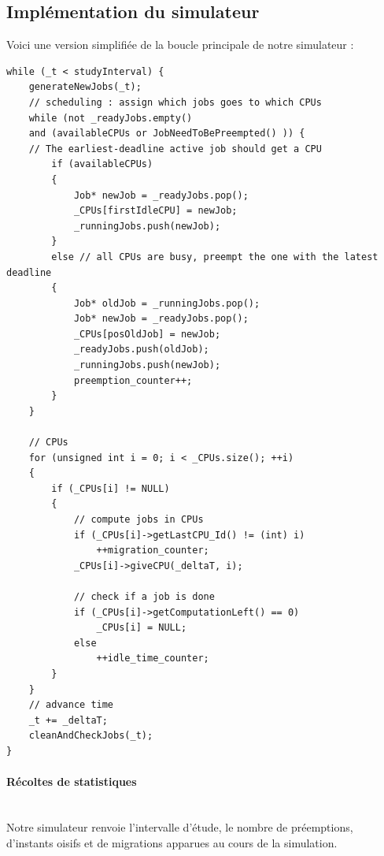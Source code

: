 \documentclass[a4paper,10pt]{article}
\begin{document}
	\subsection{Implémentation du simulateur}
		Voici une version simplifiée de la boucle principale de notre simulateur :
		\begin{lstlisting}
while (_t < studyInterval) {
	generateNewJobs(_t);
	// scheduling : assign which jobs goes to which CPUs
	while (not _readyJobs.empty()
	and (availableCPUs or JobNeedToBePreempted() )) {
	// The earliest-deadline active job should get a CPU
		if (availableCPUs)
		{
			Job* newJob = _readyJobs.pop();
			_CPUs[firstIdleCPU] = newJob;
			_runningJobs.push(newJob);
		}
		else // all CPUs are busy, preempt the one with the latest deadline
		{
			Job* oldJob = _runningJobs.pop();
			Job* newJob = _readyJobs.pop();
			_CPUs[posOldJob] = newJob;
			_readyJobs.push(oldJob);
			_runningJobs.push(newJob);
			preemption_counter++;
		}
	}

	// CPUs
	for (unsigned int i = 0; i < _CPUs.size(); ++i)
	{
		if (_CPUs[i] != NULL)
		{
			// compute jobs in CPUs
			if (_CPUs[i]->getLastCPU_Id() != (int) i)
				++migration_counter;
			_CPUs[i]->giveCPU(_deltaT, i);
			
			// check if a job is done
			if (_CPUs[i]->getComputationLeft() == 0)
				_CPUs[i] = NULL;
			else
				++idle_time_counter;
		}
	}
	// advance time
	_t += _deltaT;
	cleanAndCheckJobs(_t);
}
\end{lstlisting}
\fontfamily{}

		\paragraph*{Récoltes de statistiques}~\\

			Notre simulateur renvoie l'intervalle d'étude, le nombre de préemptions, d'instants oisifs et de migrations apparues au cours de la simulation.

		

	
\end{document}
